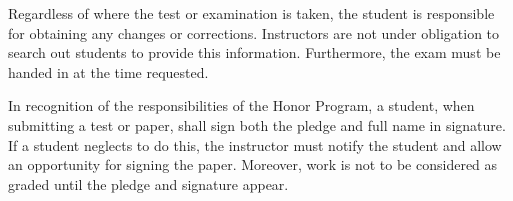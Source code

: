 {

Regardless of where the test or examination is taken, the student is
responsible for obtaining any changes or corrections. Instructors are
not under obligation to search out students to provide this information.
Furthermore, the exam must be handed in at the time requested.


In recognition of the responsibilities of the Honor Program, a student,
when submitting a test or paper, shall sign both the pledge and full
name in signature. If a student neglects to do this, the instructor must
notify the student and allow an opportunity for signing the paper.
Moreover, work is not to be considered as graded until the pledge and
signature appear.
}


